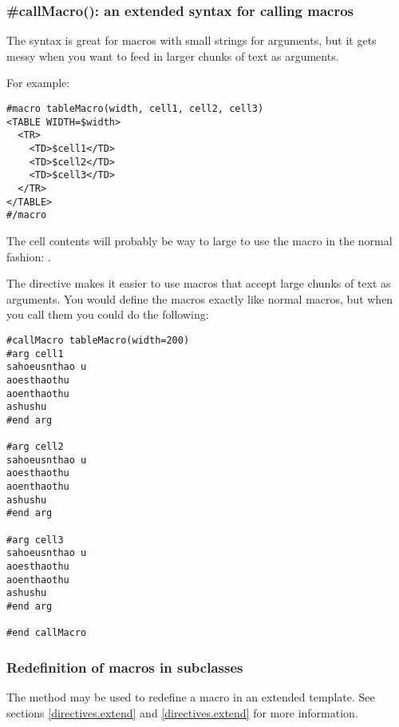 \subsubsection{\#callMacro(): an extended syntax for calling macros}
\label{directives.macros.callMacro}

The  syntax is great for macros with small strings for
arguments, but it gets messy when you want to feed in larger chunks of text as
arguments.  

For example:
\begin{verbatim}
#macro tableMacro(width, cell1, cell2, cell3)
<TABLE WIDTH=$width>
  <TR>
    <TD>$cell1</TD>
    <TD>$cell2</TD>
    <TD>$cell3</TD>
  </TR>
</TABLE>
#/macro
\end{verbatim}

The cell contents will probably be way to large to use the macro in the normal
fashion: .

The  directive makes it easier to use macros that accept
large chunks of text as arguments.  You would define the macros exactly like
normal macros, but when you call them you could do the following:

\begin{verbatim}
#callMacro tableMacro(width=200)
#arg cell1
sahoeusnthao u
aoesthaothu
aoenthaothu
ashushu
#end arg

#arg cell2
sahoeusnthao u
aoesthaothu
aoenthaothu
ashushu
#end arg

#arg cell3
sahoeusnthao u
aoesthaothu
aoenthaothu
ashushu
#end arg 

#end callMacro

\end{verbatim}


\subsubsection{Redefinition of macros in subclasses}
\label{directives.macros.redefine}

The  method may be used to
redefine a macro in an extended template.  See sections \ref{directives.extend}
and \ref{directives.extend} for more information.

